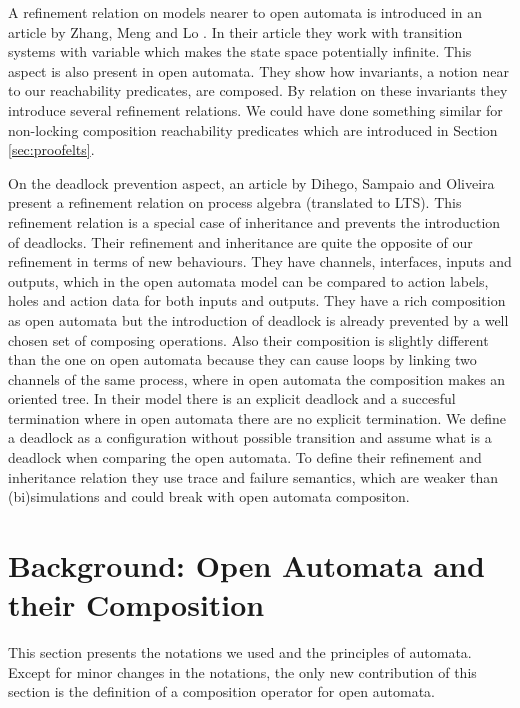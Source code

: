\documentclass[runningheads]{llncs}
\begin{document}
A refinement relation on models nearer to open automata is introduced in an article by Zhang, Meng and Lo \cite{Zhang2014}.
In their article they work with transition systems with variable which makes the state space potentially infinite.
This aspect is also present in open automata.
They show how invariants, a notion near to our reachability predicates, are composed.
By relation on these invariants they introduce several refinement relations.
We could have done something similar for non-locking composition reachability predicates which are introduced in Section \ref{sec:proofelts}.

On the deadlock prevention aspect, an article by Dihego, Sampaio and Oliveira \cite{DIHEGO2020110598} present a refinement relation on process algebra (translated to LTS).
This refinement relation is a special case of inheritance and prevents the introduction of deadlocks.
Their refinement and inheritance are quite the opposite of our refinement in terms of new behaviours.
They have channels, interfaces, inputs and outputs, which in the open automata model can be compared to action labels, holes and action data for both inputs and outputs.
They have a rich composition as open automata but the introduction of deadlock is already prevented by a well chosen set of composing operations.
Also their composition is slightly different than the one on open automata because they can cause loops by linking two channels of the same process, where in open automata the composition makes an oriented tree.
In their model there is an explicit deadlock and a succesful termination where in open automata there are no explicit termination.
We define a deadlock as a configuration without possible transition and assume what is a deadlock when comparing the open automata.
To define their refinement and inheritance relation they use trace and failure semantics, which are weaker than (bi)simulations \cite{10.5555/640428.640430} and could break with open automata compositon.


\section{Background: Open Automata and their Composition}\label{sec:background}

This section presents the notations we used and the principles of automata. Except for minor changes in the notations, the only new contribution of this section is the definition of a composition operator for open automata.
%
\end{document}
